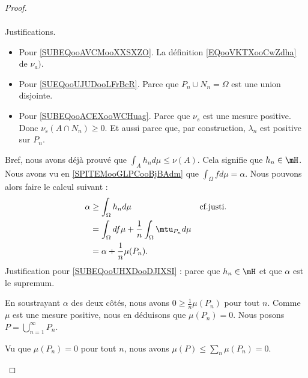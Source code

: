 \begin{proof}
\begin{subproof}
\begin{subproof}
\begin{subequations}
\begin{align}
				\end{align}
			\end{subequations}
			Justifications.
			\begin{itemize}
				\item
				      Pour \eqref{SUBEQooAVCMooXXSXZO}. La définition \eqref{EQooVKTXooCwZdha} de \( \nu_a)\).
				\item
				      Pour \eqref{SUEQooUJUDooLFrBcR}. Parce que \( P_n\cup N_n=\Omega\) est une union disjointe.
				\item
				      Pour \eqref{SUBEQooACEXooWCHuag}. Parce que \( \nu_s\) est une mesure positive. Donc \( \nu_s(A\cap N_n)\geq 0\). Et aussi parce que, par construction, \( \lambda_n\) est positive sur \( P_n\).
			\end{itemize}
			Bref, nous avons déjà prouvé que \( \int_Ah_nd\mu\leq \nu(A)\). Cela signifie que \( h_n\in \mH\).
			\spitem[\( \mu(P_n)=0\)]
			Nous avons vu en \ref{SPITEMooGLPCooBjBAdm} que \( \int_{\Omega}fd\mu=\alpha\). Nous pouvons alors faire le calcul suivant :
			\begin{subequations}
				\begin{align}
					\alpha & \geq \int_{\Omega}h_nd\mu                                    & \text{cf.justi.}	\label{SUBEQooUHXDooDJIXSI} \\
					       & = \int_{\Omega}df\mu+\frac{1}{ n}\int_{\Omega}\mtu_{P_n}d\mu                                                \\
					       & =\alpha+\frac{1}{ n}\mu(P_n).
				\end{align}
			\end{subequations}
			Justification pour \eqref{SUBEQooUHXDooDJIXSI} : parce que \( h_n\in\mH\) et que \( \alpha\) est le supremum.

			En soustrayant \( \alpha\) des deux côtés, nous avons \( 0\geq \frac{1}{ n}\mu(P_n)\) pour tout \( n\). Comme \( \mu\) est une mesure positive, nous en déduisons que \( \mu(P_n)=0\).
			\spitem[Définition de \( P\)]
			Nous posons \( P=\bigcup_{n=1}^{\infty}P_n\).

			\spitem[\( \mu(P)=0\)]
			Vu que \( \mu(P_n)=0\) pour tout \( n\), nous avons \( \mu(P)\leq \sum_n\mu(P_n)=0\).

			\spitem[\( \nu_s(\Omega\setminus P)=0\)]


\end{subproof}
\end{subproof}
\end{proof}
